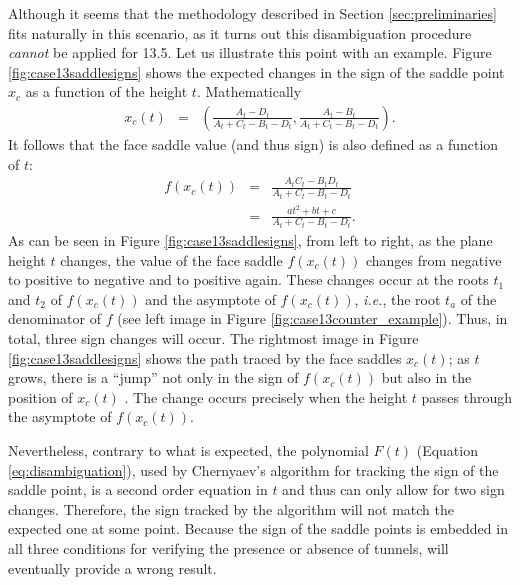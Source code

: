 Although it seems that the \mc{} methodology described in Section \ref{sec:preliminaries} fits naturally in this scenario, as it turns out this disambiguation procedure \emph{cannot} be applied for 13.5. 
%
Let us illustrate this point with an example. Figure \ref{fig:case13saddlesigns} shows the expected changes in the sign of the saddle point $x_c$ as a function of the height $t$. Mathematically
\begin{eqnarray}
x_c(t) & = & \left( \frac{A_t - D_t}{A_t+C_t-B_t-D_t}, \frac{A_t - B_t}{A_t+C_t-B_t-D_t} \right).
\end{eqnarray}
It follows that the face saddle value (and thus sign) is also defined as a function of $t$:
\begin{eqnarray}
f(x_c(t)) &=& \frac{A_tC_t - B_tD_t}{A_t+C_t-B_t-D_t}\\
       &=& \frac{a t^2 + b t + c}{A_t+C_t-B_t-D_t}.
\end{eqnarray}
As can be seen in Figure \ref{fig:case13saddlesigns}, from left to right, as the plane height $t$ changes, the value of the face saddle $f(x_c(t))$ changes from negative to positive to negative and to positive again. These changes occur at the roots $t_1$ and $t_2$ of $f(x_c(t))$ and the asymptote of $f(x_c(t))$, {\em i.e.}, the root $t_{a}$ of the denominator of $f$ (see left image in Figure \ref{fig:case13counter_example}). Thus, in total, three sign changes will occur. The rightmost image in Figure \ref{fig:case13saddlesigns} shows the path traced by the face saddles $x_c(t)$; as $t$ grows, there is a ``jump'' not only in the sign of $f(x_c(t))$ but also in the position of $x_c(t)$ . The change occurs precisely when the height $t$ passes through the asymptote of $f(x_c(t))$.

Nevertheless, contrary to what is expected, the polynomial $F(t)$ (Equation \eqref{eq:disambiguation}), used by Chernyaev's \mc{} algorithm for tracking the sign of the saddle point, is a second order equation in $t$ and thus can only allow for two sign changes. Therefore, the sign tracked by the \mc{} algorithm will not match the expected one at some point. Because the sign of the saddle points is embedded in all three  conditions for verifying the presence or absence of tunnels, \mc{} will eventually provide a wrong result.

